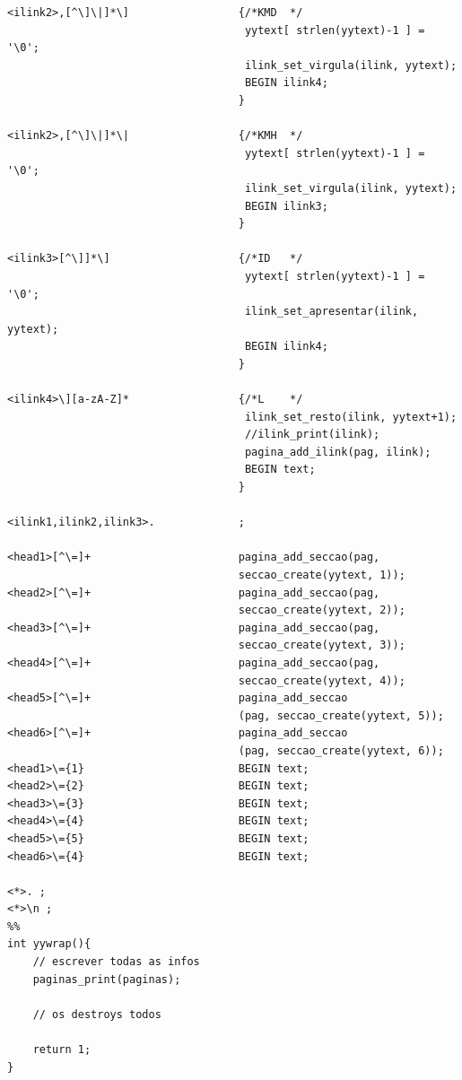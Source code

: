 \documentclass[11pt, a4paper, oneside]{article}
\begin{document}
\begin{verbatim}
<ilink2>,[^\]\|]*\]                 {/*KMD  */
                                     yytext[ strlen(yytext)-1 ] = '\0';
                                     ilink_set_virgula(ilink, yytext);
                                     BEGIN ilink4;
                                    }

<ilink2>,[^\]\|]*\|                 {/*KMH  */
                                     yytext[ strlen(yytext)-1 ] = '\0';
                                     ilink_set_virgula(ilink, yytext);
                                     BEGIN ilink3;
                                    }

<ilink3>[^\]]*\]                    {/*ID   */
                                     yytext[ strlen(yytext)-1 ] = '\0';
                                     ilink_set_apresentar(ilink, yytext);
                                     BEGIN ilink4;
                                    }

<ilink4>\][a-zA-Z]*                 {/*L    */
                                     ilink_set_resto(ilink, yytext+1);
                                     //ilink_print(ilink);
                                     pagina_add_ilink(pag, ilink);
                                     BEGIN text;
                                    }

<ilink1,ilink2,ilink3>.             ;

<head1>[^\=]+                       pagina_add_seccao(pag, 
                                    seccao_create(yytext, 1));
<head2>[^\=]+                       pagina_add_seccao(pag, 
                                    seccao_create(yytext, 2));
<head3>[^\=]+                       pagina_add_seccao(pag, 
                                    seccao_create(yytext, 3));
<head4>[^\=]+                       pagina_add_seccao(pag, 
                                    seccao_create(yytext, 4));
<head5>[^\=]+                       pagina_add_seccao
                                    (pag, seccao_create(yytext, 5));
<head6>[^\=]+                       pagina_add_seccao
                                    (pag, seccao_create(yytext, 6));
<head1>\={1}                        BEGIN text;
<head2>\={2}                        BEGIN text;
<head3>\={3}                        BEGIN text;
<head4>\={4}                        BEGIN text;
<head5>\={5}                        BEGIN text;
<head6>\={4}                        BEGIN text;

<*>. ;
<*>\n ;
%%
int yywrap(){
    // escrever todas as infos
    paginas_print(paginas);

    // os destroys todos

    return 1;
}
\end{verbatim}
\newpage
\end{document}
